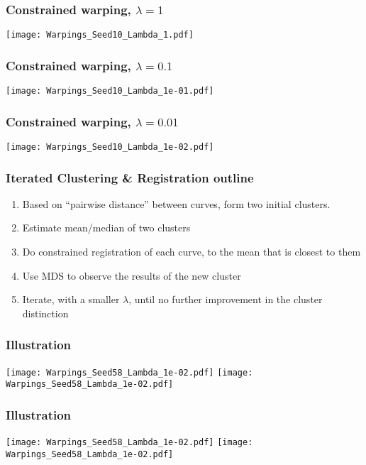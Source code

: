 \documentclass[10pt,dvipsnames,table]{beamer}
\begin{document}
\begin{frame}
\frametitle{Constrained warping, $\lambda = 1$}
\begin{center}
\texttt{[image: Warpings\_Seed10\_Lambda\_1.pdf]}
\end{center}
\end{frame}

\begin{frame}
\frametitle{Constrained warping, $\lambda = 0.1$}
\begin{center}
\texttt{[image: Warpings\_Seed10\_Lambda\_1e-01.pdf]}
\end{center}
\end{frame}

\begin{frame}
\frametitle{Constrained warping, $\lambda = 0.01$}
\begin{center}
\texttt{[image: Warpings\_Seed10\_Lambda\_1e-02.pdf]}
\end{center}
\end{frame}

\begin{frame}
\frametitle{Iterated Clustering \& Registration outline}
\begin{enumerate}
\item Based on ``pairwise distance'' between curves, form two initial clusters. 
\item Estimate mean/median of two clusters
\item Do constrained registration of each curve, to the mean that is closest to them
\item Use MDS to observe the results of the new cluster
\item Iterate, with a smaller $\lambda$, until no further improvement in the cluster distinction
\end{enumerate}
\end{frame}

\begin{frame}
\frametitle{Illustration}
\begin{center}
\texttt{[image: Warpings\_Seed58\_Lambda\_1e-02.pdf]}
\texttt{[image: Warpings\_Seed58\_Lambda\_1e-02.pdf]}
\end{center}
\end{frame}

\begin{frame}
\frametitle{Illustration}
\begin{center}
\texttt{[image: Warpings\_Seed58\_Lambda\_1e-02.pdf]}
\texttt{[image: Warpings\_Seed58\_Lambda\_1e-02.pdf]}
\end{center}
\end{frame}
\end{document}
